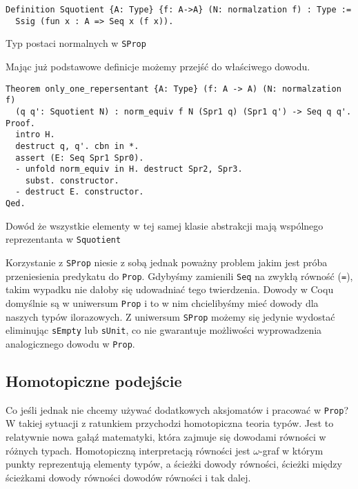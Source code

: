 \begin{code}
\begin{verbatim}
Definition Squotient {A: Type} {f: A->A} (N: normalzation f) : Type :=
  Ssig (fun x : A => Seq x (f x)).
\end{verbatim}
\caption{Typ postaci normalnych w \texttt{SProp}}
\label{SEq}
\end{code}
Mając już podstawowe definicje możemy przejść do właściwego dowodu.

\begin{code}
\begin{verbatim}
Theorem only_one_repersentant {A: Type} (f: A -> A) (N: normalzation f) 
  (q q': Squotient N) : norm_equiv f N (Spr1 q) (Spr1 q') -> Seq q q'.
Proof.
  intro H. 
  destruct q, q'. cbn in *. 
  assert (E: Seq Spr1 Spr0).
  - unfold norm_equiv in H. destruct Spr2, Spr3.
    subst. constructor.
  - destruct E. constructor.
Qed.
\end{verbatim}
\caption{Dowód że wszystkie elementy w tej samej klasie abstrakcji mają wspólnego reprezentanta w \texttt{Squotient}}
\label{norm_equiv_quotient}
\end{code}
Korzystanie z \texttt{SProp} niesie z sobą jednak poważny problem jakim jest próba przeniesienia predykatu do \texttt{Prop}. Gdybyśmy zamienili \texttt{Seq} na zwykłą równość (\texttt{=}), takim wypadku nie dałoby się udowadniać tego twierdzenia. Dowody w Coqu domyślnie są w uniwersum \texttt{Prop} i to w nim chcielibyśmy mieć dowody dla naszych typów ilorazowych. Z uniwersum \texttt{SProp} możemy się jedynie wydostać eliminując \texttt{sEmpty} lub \texttt{sUnit}, co nie gwarantuje możliwości wyprowadzenia analogicznego dowodu w \texttt{Prop}.
\subsection{Homotopiczne podejście}
Co jeśli jednak nie chcemy używać dodatkowych aksjomatów i pracować w \texttt{Prop}? W takiej sytuacji z ratunkiem przychodzi homotopiczna teoria typów. Jest to relatywnie nowa gałąź matematyki, która zajmuje się dowodami równości w różnych typach\cite{HoTT}. Homotopiczną interpretacją równości jest $\omega$-graf w którym punkty reprezentują elementy typów, a ścieżki dowody równości, ścieżki między ścieżkami dowody równości dowodów równości i tak dalej.
